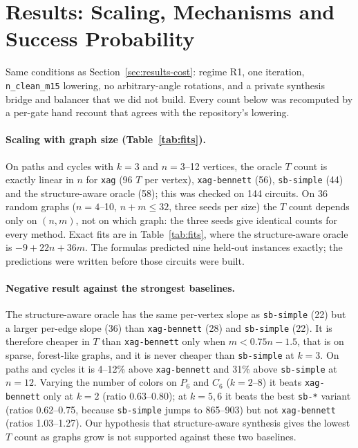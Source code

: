 \documentclass[sigconf, natbib]{acmart}
\begin{document}
\section{Results: Scaling, Mechanisms and Success Probability}
\label{sec:results-scaling}
Same conditions as Section~\ref{sec:results-cost}: regime R1, one iteration, \texttt{n\_clean\_m15} lowering, no arbitrary-angle rotations, and a private synthesis bridge and balancer that we did not build. Every count below was recomputed by a per-gate hand recount that agrees with the repository's lowering.

\paragraph{Scaling with graph size (Table~\ref{tab:fits}).} %
On paths and cycles with $k=3$ and $n=3$--12 vertices, the oracle $T$ count is exactly linear in $n$ for \texttt{xag} (96 $T$ per vertex), \texttt{xag-bennett} (56), \texttt{sb-simple} (44) and the structure-aware oracle (58); this was checked on 144 circuits. On 36 random graphs ($n=4$--10, $n+m\le 32$, three seeds per size) the $T$ count depends only on $(n,m)$, not on which graph: the three seeds give identical counts for every method. Exact fits are in Table~\ref{tab:fits}, where the structure-aware oracle is $-9+22n+36m$. The formulas predicted nine held-out instances exactly; the predictions were written before those circuits were built.

\paragraph{Negative result against the strongest baselines.} %
The structure-aware oracle has the same per-vertex slope as \texttt{sb-simple} (22) but a larger per-edge slope (36) than \texttt{xag-bennett} (28) and \texttt{sb-simple} (22). It is therefore cheaper in $T$ than \texttt{xag-bennett} only when $m<0.75n-1.5$, that is on sparse, forest-like graphs, and it is never cheaper than \texttt{sb-simple} at $k=3$. On paths and cycles it is 4--12\% above \texttt{xag-bennett} and 31\% above \texttt{sb-simple} at $n=12$. Varying the number of colors on $P_6$ and $C_6$ ($k=2$--8) it beats \texttt{xag-bennett} only at $k=2$ (ratio 0.63--0.80); at $k=5,6$ it beats the best \texttt{sb-*} variant (ratios 0.62--0.75, because \texttt{sb-simple} jumps to 865--903) but not \texttt{xag-bennett} (ratios 1.03--1.27). Our hypothesis that structure-aware synthesis gives the lowest $T$ count as graphs grow is not supported against these two baselines.
\end{document}
